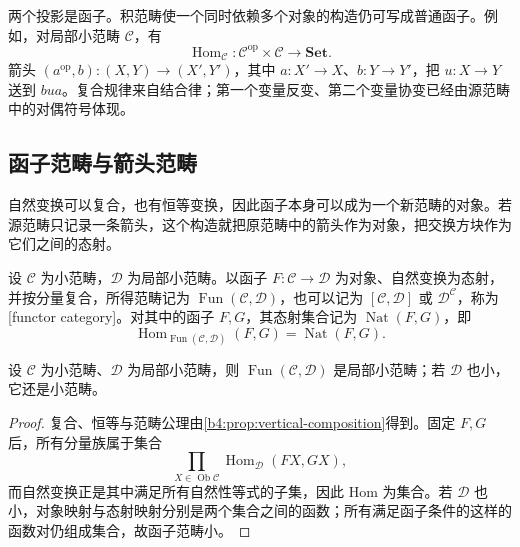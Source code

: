 两个投影是函子。积范畴使一个同时依赖多个对象的构造仍可写成普通函子。例如，对局部小范畴 \(\mathcal C\)，有
\[
	\operatorname{Hom}_{\mathcal C}: \mathcal C^{\mathrm{op}}\times\mathcal C\longrightarrow\mathbf{Set}.
\]
箭头 \((a^{\mathrm{op}},b):(X,Y)\rightarrow(X',Y')\)，其中 \(a:X'\rightarrow X\)、\(b:Y\rightarrow Y'\)，把 \(u:X\rightarrow Y\) 送到 \(bua\)。复合规律来自结合律；第一个变量反变、第二个变量协变已经由源范畴中的对偶符号体现。

\subsection{函子范畴与箭头范畴}
\label{b4:subsec:functor-arrow-categories}

自然变换可以复合，也有恒等变换，因此函子本身可以成为一个新范畴的对象。若源范畴只记录一条箭头，这个构造就把原范畴中的箭头作为对象，把交换方块作为它们之间的态射。

\begin{definition}\label{b4:def:functor-category}
	设 \(\mathcal C\) 为小范畴，\(\mathcal D\) 为局部小范畴。以函子 \(F:\mathcal C\rightarrow\mathcal D\) 为对象、自然变换为态射，并按分量复合，所得范畴记为 \(\operatorname{Fun}(\mathcal C,\mathcal D)\)，也可以记为 \([\mathcal C,\mathcal D]\) 或 \(\mathcal D^{\mathcal C}\)，称为[functor category]。对其中的函子 \(F,G\)，其态射集合记为 \(\operatorname{Nat}(F,G)\)，即
	\[
		\operatorname{Hom}_{\operatorname{Fun}(\mathcal C,\mathcal D)}(F,G) =\operatorname{Nat}(F,G).
	\]
\end{definition}

\begin{proposition}\label{b4:prop:functor-category-locally-small}
	设 \(\mathcal C\) 为小范畴、\(\mathcal D\) 为局部小范畴，则 \(\operatorname{Fun}(\mathcal C,\mathcal D)\) 是局部小范畴；若 \(\mathcal D\) 也小，它还是小范畴。
\end{proposition}
\begin{proof}
	复合、恒等与范畴公理由\cref{b4:prop:vertical-composition}得到。固定 \(F,G\) 后，所有分量族属于集合
	\[
		\prod_{X\in\operatorname{Ob}\mathcal C}\operatorname{Hom}_{\mathcal D}(FX,GX),
	\]
	而自然变换正是其中满足所有自然性等式的子集，因此 Hom 为集合。若 \(\mathcal D\) 也小，对象映射与态射映射分别是两个集合之间的函数；所有满足函子条件的这样的函数对仍组成集合，故函子范畴小。
\end{proof}

